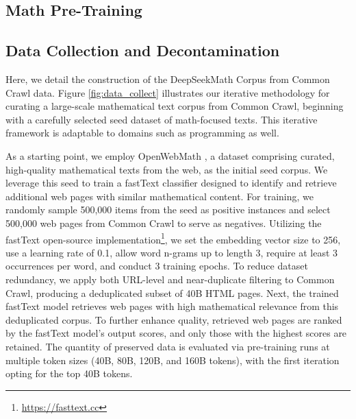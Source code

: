 \begin{itemize}[topsep=0pt]
\section{Math Pre-Training}

\subsection{Data Collection and Decontamination} 

Here, we detail the construction of the DeepSeekMath Corpus from Common Crawl data. Figure \ref{fig:data_collect} illustrates our iterative methodology for curating a large-scale mathematical text corpus from Common Crawl, beginning with a carefully selected seed dataset of math-focused texts. This iterative framework is adaptable to domains such as programming as well.

As a starting point, we employ OpenWebMath \citep{openwebmath}, a dataset comprising curated, high-quality mathematical texts from the web, as the initial seed corpus. We leverage this seed to train a fastText classifier \citep{joulin2016fasttext} designed to identify and retrieve additional web pages with similar mathematical content. For training, we randomly sample 500,000 items from the seed as positive instances and select 500,000 web pages from Common Crawl to serve as negatives. Utilizing the fastText open-source implementation\footnote{\url{https://fasttext.cc}}, we set the embedding vector size to 256, use a learning rate of 0.1, allow word n-grams up to length 3, require at least 3 occurrences per word, and conduct 3 training epochs. To reduce dataset redundancy, we apply both URL-level and near-duplicate filtering to Common Crawl, producing a deduplicated subset of 40B HTML pages. Next, the trained fastText model retrieves web pages with high mathematical relevance from this deduplicated corpus. To further enhance quality, retrieved web pages are ranked by the fastText model’s output scores, and only those with the highest scores are retained. The quantity of preserved data is evaluated via pre-training runs at multiple token sizes (40B, 80B, 120B, and 160B tokens), with the first iteration opting for the top 40B tokens.


\end{itemize}
